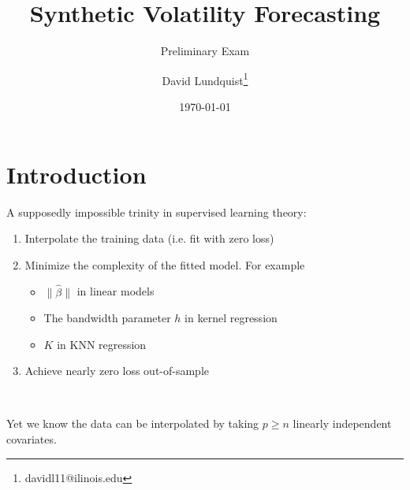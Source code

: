 \documentclass[pdf]{beamer}
\title{Synthetic Volatility Forecasting}
\subtitle{Preliminary Exam}
\author{David Lundquist\thanks{davidl11@ilinois.edu}}
\date{\today}
\begin{document}
\begin{frame}
\titlepage
\end{frame}

\section{Introduction}

\begin{frame}
A supposedly impossible trinity in supervised learning theory:\\

\begin{enumerate}
    \item Interpolate the training data (i.e. fit with zero loss)
    \item Minimize the complexity of the fitted model.  For example
        \begin{itemize}
        \item $\|\hat\beta\|$ in linear models
        \item The bandwidth parameter $h$ in kernel regression
        \item $K$ in KNN regression
        \end{itemize}
    \item Achieve nearly zero loss out-of-sample 

\end{enumerate}

\end{frame}

\begin{frame}


\\

\end{frame}

\begin{frame}


Yet we know the data can be interpolated by taking $p \geq n$ linearly independent covariates.

\end{frame}
\end{document}
